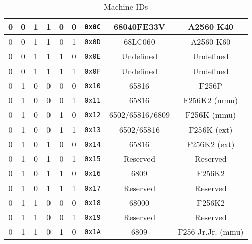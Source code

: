 \begin{table}[ht]
\begin{center}
\begin{tabular}{|c|c|c|c|c|c|c|c|c|}
            0 & 0 & 1 & 1 & 0 & 0 & \verb+0x0C+ & 68040FE33V & A2560 K40 \\ \hline
            0 & 0 & 1 & 1 & 0 & 1 & \verb+0x0D+ & 68LC060 & A2560 K60 \\ \hline
            0 & 0 & 1 & 1 & 1 & 0 & \verb+0x0E+ & Undefined & Undefined \\ \hline
            0 & 0 & 1 & 1 & 1 & 1 & \verb+0x0F+ & Undefined & Undefined  \\ \hline
            0 & 1 & 0 & 0 & 0 & 0 & \verb+0x10+ & 65816 & F256P  \\ \hline
            0 & 1 & 0 & 0 & 0 & 1 & \verb+0x11+ & 65816 & F256K2 (mmu) \\ \hline
            0 & 1 & 0 & 0 & 1 & 0 & \verb+0x12+ & 6502/65816/6809 & F256K (mmu) \\ \hline
            0 & 1 & 0 & 0 & 1 & 1 & \verb+0x13+ & 6502/65816 & F256K (ext) \\ \hline
            0 & 1 & 0 & 1 & 0 & 0 & \verb+0x14+ & 65816 & F256K2 (ext) \\ \hline
            0 & 1 & 0 & 1 & 0 & 1 & \verb+0x15+ & Reserved & Reserved  \\ \hline
            0 & 1 & 0 & 1 & 1 & 0 & \verb+0x16+ & 6809	& F256K2 \\ \hline 
            0 & 1 & 0 & 1 & 1 & 1 & \verb+0x17+ & Reserved & Reserved  \\ \hline
            0 & 1 & 1 & 0 & 0 & 0 & \verb+0x18+ & 68000 & F256K2 \\ \hline
            0 & 1 & 1 & 0 & 0 & 1 & \verb+0x19+ & Reserved & Reserved  \\ \hline
            0 & 1 & 1 & 0 & 1 & 0 & \verb+0x1A+ & 6809	& F256 Jr.Jr. (mmu) \\ \hline            
        \end{tabular}
    \end{center}
    \caption{Machine IDs}
    \label{tab:machine_ids}
\end{table}
